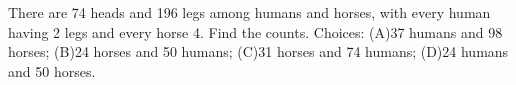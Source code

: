 There are 74 heads and 196 legs among humans and horses, with every human having 2 legs and every horse 4. Find the counts. Choices: (A)37 humans and 98 horses; (B)24 horses and 50 humans; (C)31 horses and 74 humans; (D)24 humans and 50 horses.
